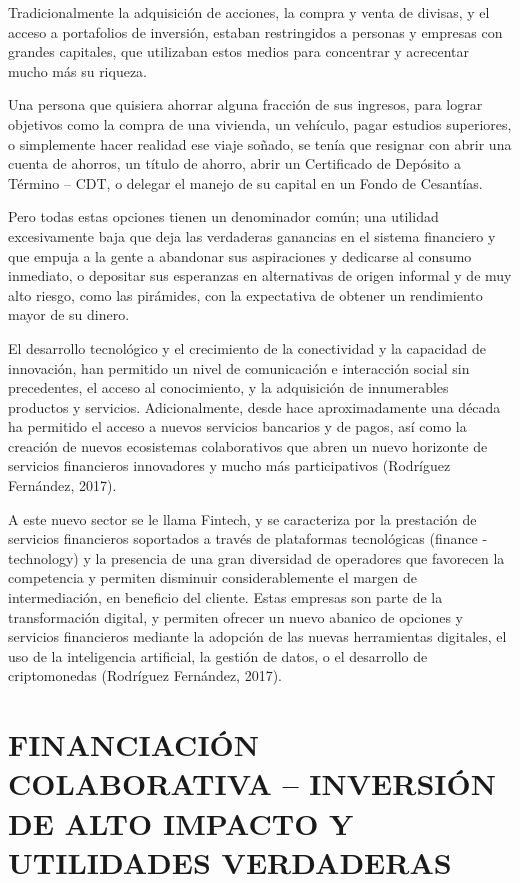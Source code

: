 \documentclass[
]{book}
\begin{document}
Tradicionalmente la adquisición de acciones, la compra y venta de divisas, y el acceso a portafolios de inversión, estaban restringidos a personas y empresas con grandes capitales, que utilizaban estos medios para concentrar y acrecentar mucho más su riqueza.

Una persona que quisiera ahorrar alguna fracción de sus ingresos, para lograr objetivos como la compra de una vivienda, un vehículo, pagar estudios superiores, o simplemente hacer realidad ese viaje soñado, se tenía que resignar con abrir una cuenta de ahorros, un título de ahorro, abrir un Certificado de Depósito a Término -- CDT, o delegar el manejo de su capital en un Fondo de Cesantías.

Pero todas estas opciones tienen un denominador común; una utilidad excesivamente baja que deja las verdaderas ganancias en el sistema financiero y que empuja a la gente a abandonar sus aspiraciones y dedicarse al consumo inmediato, o depositar sus esperanzas en alternativas de origen informal y de muy alto riesgo, como las pirámides, con la expectativa de obtener un rendimiento mayor de su dinero.

El desarrollo tecnológico y el crecimiento de la conectividad y la capacidad de innovación, han permitido un nivel de comunicación e interacción social sin precedentes, el acceso al conocimiento, y la adquisición de innumerables productos y servicios. Adicionalmente, desde hace aproximadamente una década ha permitido el acceso a nuevos servicios bancarios y de pagos, así como la creación de nuevos ecosistemas colaborativos que abren un nuevo horizonte de servicios financieros innovadores y mucho más participativos (Rodríguez Fernández, 2017).

A este nuevo sector se le llama Fintech, y se caracteriza por la prestación de servicios financieros soportados a través de plataformas tecnológicas (finance - technology) y la presencia de una gran diversidad de operadores que favorecen la competencia y permiten disminuir considerablemente el margen de intermediación, en beneficio del cliente. Estas empresas son parte de la transformación digital, y permiten ofrecer un nuevo abanico de opciones y servicios financieros mediante la adopción de las nuevas herramientas digitales, el uso de la inteligencia artificial, la gestión de datos, o el desarrollo de criptomonedas (Rodríguez Fernández, 2017).

\hypertarget{financiaciuxf3n-colaborativa-inversiuxf3n-de-alto-impacto-y-utilidades-verdaderas}{%
\chapter{FINANCIACIÓN COLABORATIVA -- INVERSIÓN DE ALTO IMPACTO Y UTILIDADES VERDADERAS}\label{financiaciuxf3n-colaborativa-inversiuxf3n-de-alto-impacto-y-utilidades-verdaderas}}
\end{document}
